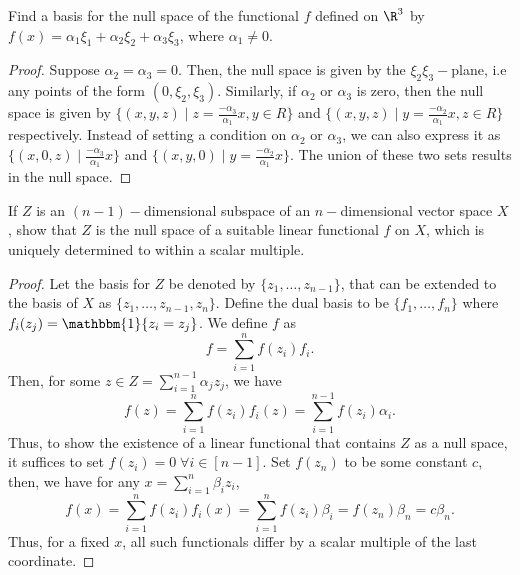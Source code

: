 \begin{question}
    Find a basis for the null space of the functional $f$ defined on $\R^3$ by $f(x) = \alpha_1 \xi_1 + \alpha_2 \xi_2 + \alpha_3 \xi_3$, where $\alpha_1 \neq 0$.
    \label{section2.9-7}
\end{question}

\begin{proof}
    Suppose $\alpha_2 = \alpha_3 = 0$. Then, the null space is given by the $\xi_2\xi_3-$plane, i.e any points of the form $(0,\xi_2 , \xi_3)$. Similarly, if $\alpha_2$ or $\alpha_3$ is zero, then the null space is given by $\{(x,y,z) \mid z = \frac{-\alpha_3}{\alpha_1}x , y \in R\}$ and $\{(x,y,z) \mid y = \frac{-\alpha_2}{\alpha_1}x , z \in R\}$ respectively. Instead of setting a condition on $\alpha_2$ or $\alpha_3$, we can also express it as $\{(x,0,z) \mid \frac{-\alpha_3}{\alpha_1}x\}$ and $\{(x,y,0) \mid y = \frac{-\alpha_2}{\alpha_1}x\}$. The union of these two sets results in the null space.
\end{proof}

\begin{question}
    If $Z$ is an $(n-1)-$dimensional subspace of an $n-$dimensional vector space $X$, show that $Z$ is the null space of a suitable linear functional $f$ on $X$, which is uniquely determined to within a scalar multiple.
    \label{section2.9-8}
\end{question}
\begin{proof}
    Let the basis for $Z$ be denoted by $\{z_1 , \ldots , z_{n-1}\}$, that can be extended to the basis of $X$ as $\{z_1 , \ldots , z_{n-1} , z_n\}$. Define the dual basis to be $\{f_1 , \ldots , f_n\}$ where $f_i(z_j) = \mathbbm{1}\{z_i = z_j\}$. We define $f$ as 
    \[f = \sum_{i=1}^n f(z_i)f_i.\]
    Then, for some $z \in Z = \sum_{i=1}^{n-1} \alpha_j z_j$, we have
    \[f(z) = \sum_{i=1}^n f(z_i) f_i(z)= \sum_{i=1}^{n-1} f(z_i) \alpha_i.\]
    Thus, to show the existence of a linear functional that contains $Z$ as a null space, it suffices to set $f(z_i) = 0 \;\forall i \in [n-1]$. Set $f(z_n)$ to be some constant $c$, then, we have for any $x = \sum_{i=1}^n \beta_i z_i$, 
    \[f(x) = \sum_{i=1}^n f(z_i) f_i(x) = \sum_{i=1}^n f(z_i) \beta_i = f(z_n)\beta_n = c\beta_n. \]
    Thus, for a fixed $x$, all such functionals differ by a scalar multiple of the last coordinate.
\end{proof}

